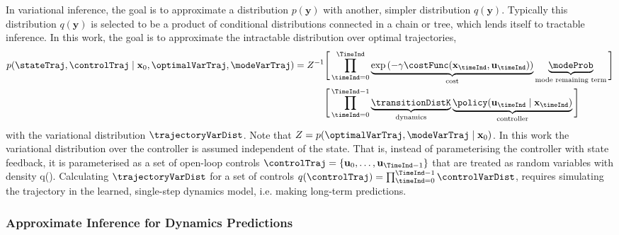 \documentclass{mimosis-class/mimosis}
\numberwithin{equation}{chapter}
\newcommand{\state}{\ensuremath{\mathbf{x}}}
\newcommand{\control}{\ensuremath{\mathbf{u}}}
\begin{document}
{In variational inference, the goal is to approximate a distribution \(p(\mathbf{y})\)
with another, simpler distribution \(q(\mathbf{y})\).
Typically this distribution \(q(\mathbf{y})\) is selected to be a product of conditional distributions connected in a
chain or tree, which lends itself to tractable inference.
In this work, the goal is to approximate the intractable distribution over optimal trajectories,
\begin{align} \label{eq-}
p(\stateTraj, \controlTraj \mid \state_0, \optimalVarTraj, \modeVarTraj)
= Z^{-1}
\Bigg[ \prod_{\timeInd=0}^{\TimeInd}
&\underbrace{\exp \left( - \gamma  \costFunc(\state_\timeInd, \control_\timeInd) \right)}_{\text{cost}}
\underbrace{\modeProb}_{\text{mode remaining term}}
\Bigg]
\nonumber \\
\Bigg[ \prod_{\timeInd=0}^{\TimeInd-1}
&\underbrace{ \transitionDistK}_{\text{dynamics}}
\underbrace{ \policy(\control_\timeInd \mid \state_\timeInd) }_{\text{controller}}
\Bigg]
\end{align}
with the variational distribution \(\trajectoryVarDist\).
Note that \(Z=p(\optimalVarTraj, \modeVarTraj \mid \state_0)\).
In this work the variational distribution over the controller is assumed independent of the state.
That is, instead of parameterising the controller with state feedback, it is parameterised as a set
of open-loop controls \(\controlTraj = \{\control_0, \ldots, \control_{\TimeInd-1}\}\) that are treated as random
variables with density q(\controlTraj).
Calculating \(\trajectoryVarDist\) for a set of controls
\(q(\controlTraj) = \prod_{\timeInd=0}^{\TimeInd-1} \controlVarDist\),
requires simulating the trajectory in the learned,
single-step dynamics model, i.e. making long-term predictions.

\subsubsection{Approximate Inference for Dynamics Predictions}
\label{sec:org2af0db3}

}
\end{document}
